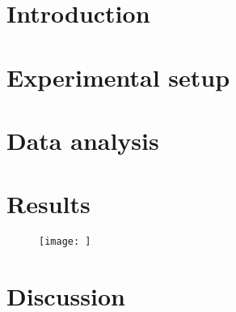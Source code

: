 \documentclass{article}
\begin{document}
\section{Introduction}
\section{Experimental setup}
\section{Data analysis}
\section{Results}
\begin{figure}
\texttt{[image: ]}
\end{figure}
\section{Discussion}
\end{document}
